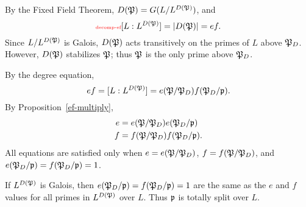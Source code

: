 By the Fixed Field Theorem, $D(\mathfrak{P})=G(L/L^{D(\mathfrak{P})})$, and 
\begin{equation}\llabel{decomp-ef}
[L:L^{D(\mP)}]=|D(\mP)|=ef.\end{equation}
Since $L/L^{D(\mathfrak{P})}$ is Galois, $D(\mathfrak{P})$ acts transitively on the primes of $L$ above $\mathfrak{P}_D$. However, $D(\mathfrak{P})$ stabilizes $\mathfrak{P}$; thus $\mathfrak{P}$ is the only prime above $\mathfrak{P}_D$.

By the degree equation, 
\[
ef=[L:L^{D(\mathfrak{P})}]=e(\mathfrak{P}/\mathfrak{P}_D)f(\mathfrak{P}_D/\mathfrak{p}).
\]
By Proposition~\ref{ef-multiply},
\begin{align*}
e&=e(\mathfrak{P}/\mathfrak{P}_D)e(\mathfrak{P}_D/\mathfrak{p})\\
f&=f(\mathfrak{P}/\mathfrak{P}_D)f(\mathfrak{P}_D/\mathfrak{p}).
\end{align*}
All equations are satisfied only when $e=e(\mathfrak{P}/\mathfrak{P}_D)$, $f=f(\mathfrak{P}/\mathfrak{P}_D)$, and $e(\mathfrak{P}_D/\mathfrak{p})=f(\mathfrak{P}_D/\mathfrak{p})=1$.

If $L^{D(\mathfrak{P})}$ is Galois, then $e(\mathfrak{P}_D/\mathfrak{p})=f(\mathfrak{P}_D/\mathfrak{p})=1$ are the same as the $e$ and $f$ values for all primes in $L^{D(\mathfrak{P})}$ over $L$. Thus $\mathfrak{p}$ is totally split over $L$.
